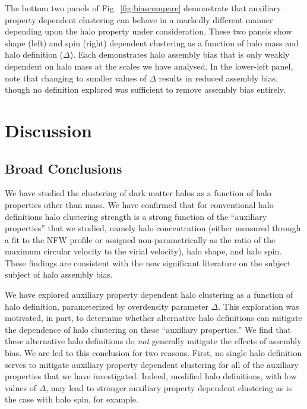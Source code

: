 \documentclass[usenatbib,fleqn]{mnras}
\begin{document}
The bottom two panels of Fig.~\ref{fig:biascompare} demonstrate that auxiliary property dependent clustering can behave in a markedly different manner depending upon the halo property under consideration. These two panels show shape (left) and spin (right) dependent clustering as a function of halo mass and halo definition ($\Delta$). Each demonstrates halo assembly bias that is only weakly dependent on halo mass at the scales we have analysed. In the lower-left panel, note that changing to smaller values of $\Delta$ results in reduced assembly bias, though no definition explored was sufficient to remove assembly bias entirely. 

\section{Discussion}
\label{section:discussion}

\subsection{Broad Conclusions}

We have studied the clustering of dark matter halos as a function of halo properties other than mass. We have confirmed that for conventional halo definitions halo clustering strength is a strong function of the  ``auxiliary properties'' that we studied, namely halo concentration (either measured through a fit to the NFW profile or assigned non-parametrically as the ratio of the maximum circular velocity to the virial velocity), halo shape, and halo spin. These findings are consistent with the now significant literature on the subject subject of halo assembly bias. \citep{peacock_smith00, wechsler_etal02,sheth_tormen04, gao_etal05, zentner_etal05, allgood_etal06, harker_etal06, wechsler_etal06, croton_etal07, zentner07, dalal_etal08, zentner_etal14, mao_etal15, sunayama_etal16}

We have explored auxiliary property dependent halo clustering as a function of halo definition, parameterized by overdensity parameter $\Delta$. This exploration was motivated, in part, to determine whether alternative halo definitions can mitigate the dependence of halo clustering on these ``auxiliary properties.'' We find that these alternative halo definitions do {\em not} generally mitigate the effects of assembly bias. We are led to this conclusion for two reasons. First, no single halo definition serves to mitigate auxiliary property dependent clustering for all of the auxiliary properties that we have investigated. Indeed, modified halo definitions, with low values of $\Delta$, may lead to stronger auxiliary property dependent clustering as is the case with halo spin, for example.
\end{document}
